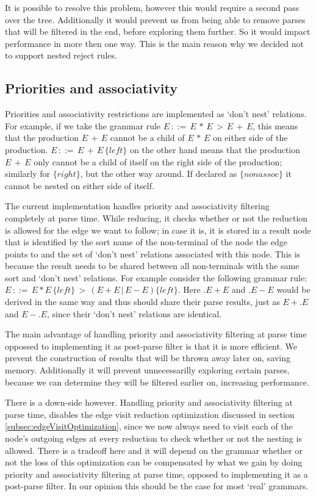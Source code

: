 \documentclass[a4paper,10pt]{article}
\begin{document}
It is possible to resolve this problem, however this would require a second pass over the tree. Additionally it would prevent us from being able to remove parses that will be filtered in the end, before exploring them further. So it would impact performance in more then one way. This is the main reason why we decided not to support nested reject rules.

\subsection{Priorities and associativity}

Priorities and associativity restrictions are implemented as `don't nest' relations. For example, if we take the grammar rule $E\,::=\,E\,*\,E\,>\,E\,+\,E$, this means that the production $E\,+\,E$ cannot be a child of $E\,*\,E$ on either side of the production. $E\,::=\,E\,+\,E\,\{left\}$ on the other hand means that the production $E\,+\,E$ only cannot be a child of itself on the right side of the production; similarly for $\{right\}$, but the other way around. If declared as $\{nonassoc\}$ it cannot be nested on either side of itself.

The current implementation handles priority and associativity filtering completely at parse time. While reducing, it checks whether or not the reduction is allowed for the edge we want to follow; in case it is, it is stored in a result node that is identified by the sort name of the non-terminal of the node the edge points to and the set of `don't nest' relations associated with this node. This is because the result needs to be shared between all non-terminals with the same sort and `don't nest' relations. For example consider the following grammar rule: $E\,::=\,E * E\,\{left\}\,>\,(E + E\,|\,E - E)\{left\}$. Here $.E + E$ and $.E - E$ would be derived in the same way and thus should share their parse results, just as $E+.E$ and $E-.E$, since their `don't nest' relations are identical.

The main advantage of handling priority and associativity filtering at parse time oppossed to implementing it as post-parse filter is that it is more efficient. We prevent the construction of results that will be thrown away later on, saving memory. Additionally it will prevent unnecessarilly exploring certain parses, because we can determine they will be filtered earlier on, increasing performance.

There is a down-side however. Handling priority and associativity filtering at parse time, disables the edge visit reduction optimization discussed in section \ref{subsec:edgeVisitOptimization}, since we now always need to visit each of the node's outgoing edges at every reduction to check whether or not the nesting is allowed. There is a tradeoff here and it will depend on the grammar whether or not the loss of this optimization can be compensated by what we gain by doing priority and associativity filtering at parse time, opposed to implementing it as a post-parse filter. In our opinion this should be the case for most `real' grammars.
\end{document}
